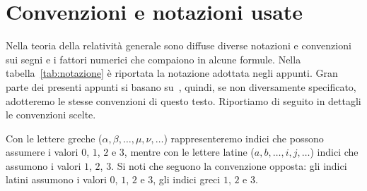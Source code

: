 \cleardoublepage
\chapter{Convenzioni e notazioni usate}
\label{cha:notazioni}

Nella teoria della relatività generale sono diffuse diverse notazioni e
convenzioni sui segni e i fattori numerici che compaiono in alcune formule.
Nella tabella~\ref{tab:notazione} è riportata la notazione adottata negli
appunti.  Gran parte dei presenti appunti si basano
su~\textcite{weinberg:gravitation}, quindi, se non diversamente specificato,
adotteremo le stesse convenzioni di questo testo.  Riportiamo di seguito in
dettagli le convenzioni scelte.

Con le lettere greche ($\alpha,\beta,\dots,\mu,\nu,\dots$) rappresenteremo
indici che possono assumere i valori $0$, $1$, $2$ e $3$, mentre con le lettere
latine ($a,b,\dots,i,j,\dots$) indici che assumono i valori $1$, $2$, $3$.  Si
noti che \textcite{landau:campo} seguono la convenzione opposta: gli indici
latini assumono i valori $0$, $1$, $2$ e $3$, gli indici greci $1$, $2$ e $3$.

